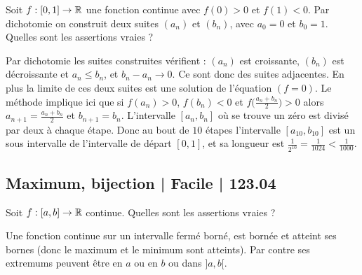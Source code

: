 \begin{question}

Soit $f : [0,1] \to \mathbb{R}$ une fonction continue avec $f(0)>0$ et $f(1)<0$.
Par dichotomie on construit deux suites $(a_n)$ et $(b_n)$, avec $a_0 = 0$ et $b_0 = 1$. Quelles sont les assertions vraies ?
\begin{answers}



    
\end{answers}
\begin{explanations}
Par dichotomie les suites construites vérifient : $(a_n)$ est croissante, $(b_n)$ est décroissante et $a_n \le b_n$, et $b_n-a_n \to 0$. Ce sont donc des suites adjacentes. En plus la limite de ces deux suites est une solution de l'équation $(f=0)$.
Le méthode implique ici que si $f(a_n)>0$, $f(b_n)<0$ et $f\big(\frac{a_n+b_n}{2}\big) >0$ alors $a_{n+1} =\frac{a_n+b_n}{2}$ et $b_{n+1}=b_n$.
L'intervalle $[a_n,b_n]$ où se trouve un zéro est divisé par deux à chaque étape. Donc au bout de $10$ étapes l'intervalle
$[a_{10},b_{10}]$ est un sous intervalle de l'intervalle de départ $[0,1]$, et sa longueur est $\frac{1}{2^{10}} = \frac{1}{1024} < \frac1{1000}$.
\end{explanations}
\end{question}



\subsection{Maximum, bijection | Facile | 123.04}


\begin{question}

Soit $f : [a,b] \to \mathbb{R}$ continue. Quelles sont les assertions vraies ?
\begin{answers}
    \bad{$f$ admet un maximum sur $]a,b[$.}


    \good{$f$ est bornée sur $]a,b[$.}

\end{answers}
\begin{explanations}
Une fonction continue sur un intervalle fermé borné, est bornée et atteint ses bornes (donc le maximum et le minimum sont atteints). Par contre ses extremums peuvent être en $a$ ou en $b$ ou dans $]a,b[$.
\end{explanations}
\end{question}


